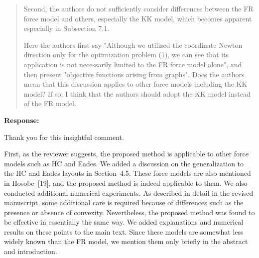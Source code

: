 \documentclass[11pt]{article}
\newcommand{\reviewercomment}[1]{%
  \begin{quote}
  \color{blue}
  #1
  \end{quote}
}
\newenvironment{response}{%
  \noindent\textbf{Response:}%
}{%
  \medskip
}
\begin{document}
\reviewercomment{
  Second, the authors do not sufficiently consider differences between the FR force model and others, especially the KK model, which becomes apparent especially in Subsection 7.1.

  Here the authors first say "Although we utilized the coordinate Newton direction only for the optimization problem (1), we can see that its application is not necessarily limited to the FR force model alone", and then present "objective functions arising from graphs".
  Does the authors mean that this discussion applies to other force models including the KK model?
  If so, I think that the authors should adopt the KK model instead of the FR model.
}

\begin{response}
  Thank you for this insightful comment.

  First, as the reviewer suggests, the proposed method is applicable to other force models such as HC and Eades.
  We added a discussion on the generalization to the HC and Eades layouts in Section~4.5.
  These force models are also mentioned in Hosobe~[19], and the proposed method is indeed applicable to them.
  We also conducted additional numerical experiments.
  As described in detail in the revised manuscript, some additional care is required because of differences such as the presence or absence of convexity. Nevertheless, the proposed method was found to be effective in essentially the same way.
  We added explanations and numerical results on these points to the main text.
  Since these models are somewhat less widely known than the FR model, we mention them only briefly in the abstract and introduction.


\end{response}
\end{document}
